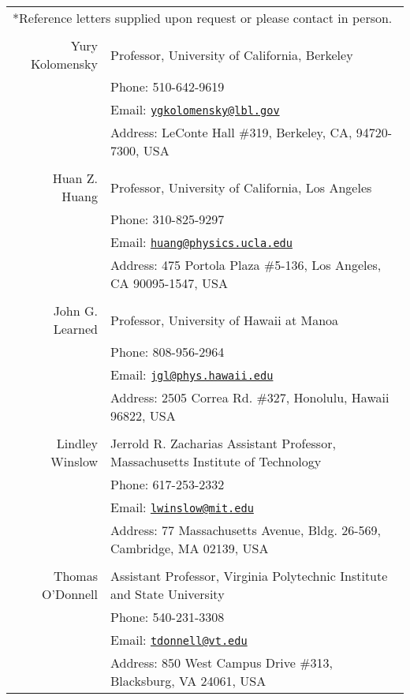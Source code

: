 \documentclass[11pt]{article} %
\begin{document}
\noindent\begin{tabular}{rp{12cm}}
\multicolumn{2}{l}{\footnotesize{*Reference letters supplied upon request or
	please contact in person.}}\\
\multicolumn{2}{c}{}\\

Yury Kolomensky & Professor, University of California, Berkeley\\
& Phone: 510-642-9619\\
& Email: \href{mailto:ygkolomensky@lbl.gov}{\nolinkurl{ygkolomensky@lbl.gov}}\\
& Address: LeConte Hall \#319, Berkeley, CA, 94720-7300, USA\\
\\
Huan Z. Huang & Professor, University of California, Los Angeles\\
& Phone: 310-825-9297\\
& Email: \href{mailto:huang@physics.ucla.edu}{\nolinkurl{huang@physics.ucla.edu}}\\
& Address: 475 Portola Plaza \#5-136, Los Angeles, CA 90095-1547, USA\\
\\
John G. Learned & Professor, University of Hawaii at Manoa\\
& Phone: 808-956-2964\\
& Email: \href{mailto:jgl@phys.hawaii.edu}{\nolinkurl{jgl@phys.hawaii.edu}}\\
& Address: 2505 Correa Rd. \#327, Honolulu, Hawaii 96822, USA\\
\\
Lindley Winslow & Jerrold R. Zacharias Assistant Professor, Massachusetts Institute of Technology\\
& Phone: 617-253-2332\\
& Email: \href{mailto:lwinslow@mit.edu}{\nolinkurl{lwinslow@mit.edu}}\\ 
& Address: 77 Massachusetts Avenue, Bldg. 26-569, Cambridge, MA 02139, USA\\
\\
Thomas O'Donnell & Assistant Professor, Virginia Polytechnic Institute and State University\\
& Phone: 540-231-3308\\
& Email: \href{mailto:tdonnell@vt.edu}{\nolinkurl{tdonnell@vt.edu}}\\
& Address: 850 West Campus Drive \#313, Blacksburg, VA 24061, USA\\


\end{tabular}
\end{document}
